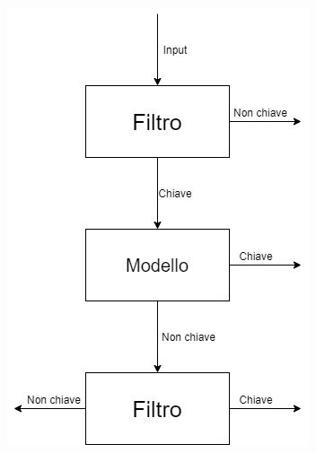 \documentclass[../../main.tex]{subfiles}
\begin{document}
\begin{figure}[H]
\begin{subfigure}[c]{0.3\textwidth}
            \label{fig:appartenenzaLBF}
        \end{subfigure}
        \begin{subfigure}[c]{0.3\textwidth}
            \includegraphics[width=\textwidth]{immagini/5_2/SLBF.png}
            \caption{}
            \label{fig:appartenenzaSLBF}
        \end{subfigure}
        \caption{}
        \label{fig:DifferenzeFiltri}
    \end{figure}
\end{document}
